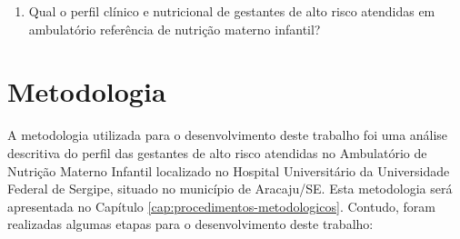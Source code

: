 \begin{enumerate}[label=\textbf{{QP}{\arabic*}}:,itemindent=1em,leftmargin=3.5em]
\item{Qual o perfil clínico e nutricional de gestantes de alto risco atendidas em ambulatório referência de nutrição materno infantil?}

\end{enumerate}

\section{Metodologia}\label{sec:intro:metodologia}
A metodologia utilizada para o desenvolvimento deste trabalho foi uma análise descritiva do perfil das gestantes de alto risco atendidas no Ambulatório de Nutrição Materno Infantil localizado no Hospital Universitário da Universidade Federal de Sergipe, situado no município de Aracaju/SE. Esta metodologia será apresentada no Capítulo \ref{cap:procedimentos-metodologicos}. Contudo, foram realizadas algumas etapas para o desenvolvimento deste trabalho:

